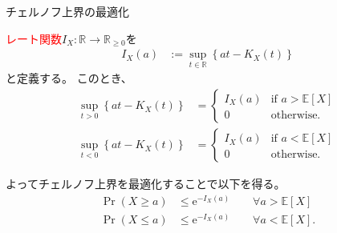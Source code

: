 \documentclass[lualatex,handout]{beamer}
\newcommand{\emm}[1]{\textcolor{red}{#1}}
\newcommand{\expt}[1]{\mathbb{E}\left[#1\right]}
\theoremstyle{definition}
\begin{document}
\begin{frame}{チェルノフ上界の最適化}
\begin{lemma}
\emm{レート関数}$I_X\colon\mathbb{R}\to\mathbb{R}_{\ge 0}$を
\begin{align*}
I_X(a) &:= \sup_{t \in\mathbb{R}}\left\{at - K_X(t)\right\}
\end{align*}
と定義する。
このとき、
\begin{align*}
\sup_{t>0}\left\{at-K_X(t)\right\}&=\begin{cases}
I_X(a)&\text{if } a > \expt{X}\\
0&\text{otherwise.}
\end{cases}\\
\sup_{t<0}\left\{at-K_X(t)\right\}&=\begin{cases}
I_X(a)&\text{if } a < \expt{X}\\
0&\text{otherwise.}
\end{cases}
\end{align*}
\end{lemma}
よってチェルノフ上界を最適化することで以下を得る。
\begin{align*}
\Pr\left(X\ge a\right) &\le \mathrm{e}^{-I_X(a)}\qquad\forall a>\expt{X}\\
\Pr\left(X\le a\right) &\le \mathrm{e}^{-I_X(a)}\qquad\forall a<\expt{X}.
\end{align*}
\end{frame}
\end{document}
